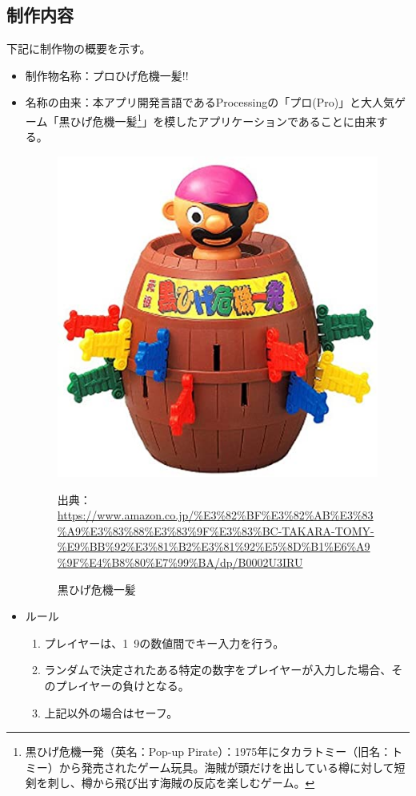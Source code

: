 \documentclass[dvipdfmx]{jsarticle}
\begin{document}
\subsection{制作内容}
下記に制作物の概要を示す。
\begin{itemize}
  \item 制作物名称：プロひげ危機一髪!!
  \item 名称の由来：本アプリ開発言語であるProcessingの「プロ(Pro)」と大人気ゲーム「黒ひげ危機一髪\footnote{黒ひげ危機一発（英名：Pop-up Pirate）：1975年にタカラトミー（旧名：トミー）から発売されたゲーム玩具。海賊が頭だけを出している樽に対して短剣を刺し、樽から飛び出す海賊の反応を楽しむゲーム。}」を模したアプリケーションであることに由来する。
  \begin{figure}[H]
    \centering
    \includegraphics[scale=0.2]{images/51FOE881fOL._AC_SS450_.jpg}
    \caption{黒ひげ危機一髪}
    出典：\url{https://www.amazon.co.jp/%E3%82%BF%E3%82%AB%E3%83%A9%E3%83%88%E3%83%9F%E3%83%BC-TAKARA-TOMY-%E9%BB%92%E3%81%B2%E3%81%92%E5%8D%B1%E6%A9%9F%E4%B8%80%E7%99%BA/dp/B0002U3IRU}
  \end{figure}
  \item ルール
  \begin{enumerate}
    \item プレイヤーは、1~9の数値間でキー入力を行う。
    \item ランダムで決定されたある特定の数字をプレイヤーが入力した場合、そのプレイヤーの負けとなる。
    \item 上記以外の場合はセーフ。
  \end{enumerate}
\end{itemize}
\end{document}
